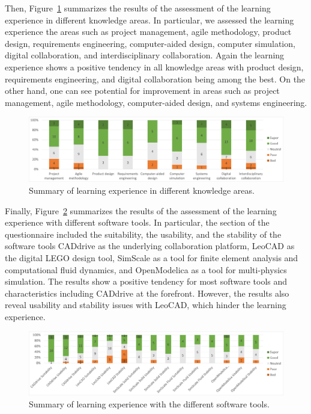 \documentclass{PDS}
\begin{document}
Then, Figure~\ref{fig:after-knowledge} summarizes the results of the assessment of the learning experience in different knowledge areas.
In particular, we assessed the learning experience the areas such as project management, agile methodology, product design, requirements engineering, computer-aided design, computer simulation, digital collaboration, and interdisciplinary collaboration.
Again the learning experience shows a positive tendency in all knowledge areas with product design, requirements engineering, and digital collaboration being among the best.
On the other hand, one can see potential for improvement in areas such as project management, agile methodology, computer-aided design, and systems engineering.

\begin{figure}[htbp]
    \centering
    \includegraphics[width=\textwidth]{./diagrams/after-knowledge.png}
    \caption{Summary of learning experience in different knowledge areas.}
    \label{fig:after-knowledge}
\end{figure}

Finally, Figure~\ref{fig:after-software} summarizes the results of the assessment of the learning experience with different software tools.
In particular, the section of the questionnaire included the suitability, the usability, and the stability of the software tools CADdrive as the underlying collaboration platform, LeoCAD as the digital LEGO design tool, SimScale as a tool for finite element analysis and computational fluid dynamics, and OpenModelica as a tool for multi-physics simulation.
The results show a positive tendency for most software tools and characteristics including CADdrive at the forefront.
However, the results also reveal usability and stability issues with LeoCAD, which hinder the learning experience.

\begin{figure}[htbp]
    \centering
    \includegraphics[width=\textwidth]{./diagrams/after-software.png}
    \caption{Summary of learning experience with the different software tools.}
    \label{fig:after-software}
\end{figure}
\end{document}
